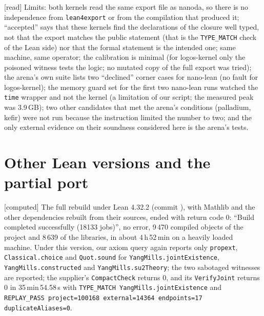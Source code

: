 \documentclass[11pt,a4paper]{article}
\theoremstyle{plain}
\theoremstyle{definition}
\theoremstyle{remark}
\numberwithin{equation}{section}
\newcommand{\st}[1]{\textsf{[#1]}}
\begin{document}
\st{read} Limits: both kernels read the same export file as nanoda, so there is no independence from \texttt{lean4export} or from the
compilation that produced it; ``accepted'' says that these kernels find the declarations of the closure well typed, not that the
export matches the public statement (that is the \texttt{TYPE\_MATCH} check of the Lean side) nor that the formal statement is the
intended one; same machine, same operator; the calibration is minimal (for logos-kernel only the poisoned witness tests the logic;
no mutated copy of the full export was tried); the arena's own suite lists two ``declined'' corner cases for nano-lean (no fault for logos-kernel); the memory guard set for the first two nano-lean runs watched the \texttt{time} wrapper and not the kernel (a limitation of our script; the measured peak was 3.9\,GB); two other candidates that met the arena's conditions (palladium, kefir) were not run because the instruction limited the number to two; and the only external evidence on their soundness considered here is the arena's tests.

\section{Other Lean versions and the partial port}\label{sec:port}

\st{computed} The full rebuild under Lean 4.32.2 (commit ), with
Mathlib and the other dependencies rebuilt from their sources, ended with return code 0: ``Build completed
successfully (18133 jobs)'', no error, 9\,470 compiled objects of the project and 8\,639 of the libraries, in
about 4\,h\,52\,min on a heavily loaded machine. Under this version, our axiom query again reports only
\texttt{propext}, \texttt{Classical.choice} and \texttt{Quot.sound} for \texttt{YangMills.jointExistence},
\texttt{YangMills.constructed} and \texttt{YangMills.su2Theory}; the two sabotaged witnesses are reported; the
supplier's \texttt{CompactCheck} returns 0, and its \texttt{VerifyJoint} returns 0 in 35\,min\,54.58\,s with
\texttt{TYPE\_MATCH YangMills.jointExistence} and \texttt{REPLAY\_PASS project=100168 external=14364
endpoints=17 duplicateAliases=0}.
\end{document}
